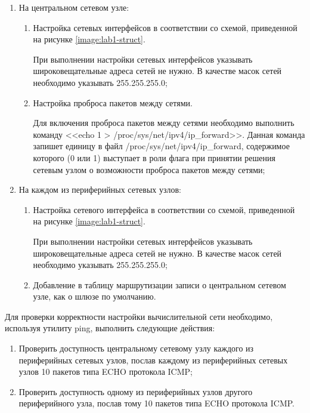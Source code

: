 	\begin{enumerate}

		\item На центральном сетевом узле:

			\begin{enumerate}

				\item Настройка сетевых интерфейсов в соответствии со схемой, приведенной на рисунке
				\ref{image:lab1-struct}.

				При выполнении настройки сетевых интерфейсов указывать широковещательные адреса сетей не нужно.
				В качестве масок сетей необходимо указывать 255.255.255.0;

				\item Настройка проброса пакетов между сетями.

				Для включения проброса пакетов между сетями необходимо выполнить команду <<echo 1 > /proc/sys/net/ipv4/ip\_forward>>.
				Данная команда запишет единицу в файл /proc/sys/net/ipv4/ip\_forward, содержимое которого (0 или 1) выступает в роли флага при
				принятии решения сетевым узлом о возможности проброса пакетов между сетями;

			\end{enumerate}

		\item На каждом из периферийных сетевых узлов:

			\begin{enumerate}

				\item Настройка сетевого интерфейса в соответствии со схемой, приведенной на рисунке
				\ref{image:lab1-struct}.

				При выполнении настройки сетевых интерфейсов указывать широковещательные адреса сетей не нужно.
				В качестве масок сетей необходимо указывать 255.255.255.0;

				\item Добавление в таблицу маршрутизации записи о центральном сетевом узле, как о шлюзе по умолчанию.

			\end{enumerate}

	\end{enumerate}

	Для проверки корректности настройки вычислительной сети необходимо, используя утилиту ping, выполнить следующие действия:

	\begin{enumerate}

		\item Проверить доступность центральному сетевому узлу каждого из периферийных сетевых узлов,
		послав каждому из периферийных сетевых узлов 10 пакетов типа ECHO протокола ICMP;

		\item Проверить доступность одному из периферийных узлов другого периферийного узла,
		послав тому 10 пакетов типа ECHO протокола ICMP.

	\end{enumerate}


